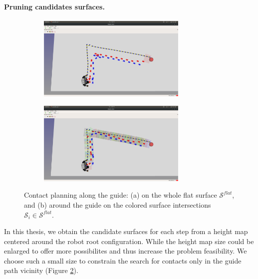 \paragraph{Pruning candidates surfaces.\label{subsub:mip:discussion:candidate_surfaces}}
\begin{figure}[t]
    \centering
    \captionsetup[subfigure]{justification=centering}
    \begin{subfigure}[t]{0.48\linewidth}
    \includegraphics[trim={15cm 4cm 10cm 9cm},clip,width=\textwidth,height=4cm]{Figures/Chapter_MIP_SL1M/flat_candidate_surf/ground_guide_uncontrained.png}
    \caption{}
    \label{fig:mip:flat:unconstrained}
    \end{subfigure}
    \begin{subfigure}[t]{0.48\linewidth}
    \includegraphics[trim={15cm 4cm 10cm 9cm},clip,width=\textwidth,height=4cm]{Figures/Chapter_MIP_SL1M/flat_candidate_surf/ground_guide_contrained.png}
    \caption{}
    \label{fig:mip:flat:constrained}
    \end{subfigure}
    \caption{Contact planning along the guide: (a) on the whole flat surface $\mathcal{S}^{flat}$, and (b) around the guide on the colored surface intersections $\mathcal{S}_i \in \mathcal{S}^{flat}$.}
    \label{fig:mip:flat:constrained_or_not}
\end{figure}
In this thesis, we obtain the candidate surfaces for each step from a height map centered around the robot root configuration. While the height map size could be enlarged to offer more possibilites and thus increase the problem feasibility.
We choose such a small size to constrain the search for contacts only in the guide path vicinity (Figure \ref{fig:mip:flat:constrained}).

